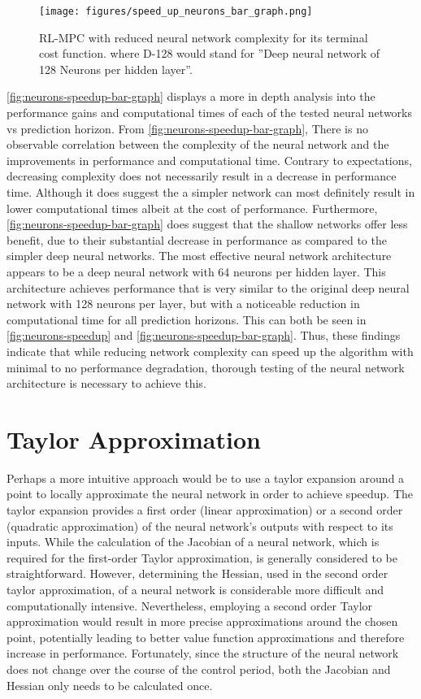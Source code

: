 \begin{figure}[H]
	\centering
	\texttt{[image: figures/speed\_up\_neurons\_bar\_graph.png]}
	\caption{RL-MPC with reduced neural network complexity for its terminal cost function. where D-128 would stand for ''Deep neural network of 128 Neurons per hidden layer''.}
	\label{fig:neurons-speedup-bar-graph}
\end{figure}
\autoref{fig:neurons-speedup-bar-graph} displays a more in depth analysis into the performance gains and computational times of each of the tested neural networks vs prediction horizon. From \autoref{fig:neurons-speedup-bar-graph}, There is no observable correlation between the complexity of the neural network and the improvements in performance and computational time. Contrary to expectations, decreasing complexity does not necessarily result in a decrease in performance time. Although it does suggest the a simpler network can most definitely result in lower computational times albeit at the cost of performance. Furthermore, \autoref{fig:neurons-speedup-bar-graph} does suggest that the shallow networks offer less benefit, due to their substantial decrease in performance as compared to the simpler deep neural networks. The most effective neural network architecture appears to be a deep neural network with 64 neurons per hidden layer. This architecture achieves performance that is very similar to the original deep neural network with 128 neurons per layer, but with a noticeable reduction in computational time for all prediction horizons. This can both be seen in \autoref{fig:neurons-speedup} and \autoref{fig:neurons-speedup-bar-graph}. Thus, these findings indicate that while reducing network complexity can speed up the algorithm with minimal to no performance degradation, thorough testing of the neural network architecture is necessary to achieve this.



\section{Taylor Approximation}
Perhaps a more intuitive approach would be to use a taylor expansion around a point to locally approximate the neural network in order to achieve speedup. The taylor expansion provides a  first order (linear approximation) or a second order (quadratic approximation) of the neural network's outputs with respect to its inputs. While the calculation of the Jacobian of a neural network, which is required for the first-order Taylor approximation, is generally considered to be straightforward. However, determining the Hessian, used in the second order taylor approximation, of a neural network is considerable more difficult and computationally intensive. Nevertheless, employing a second order Taylor approximation would result in more precise approximations around the chosen point, potentially leading to better value function approximations and therefore increase in performance. Fortunately, since the structure of the neural network does not change over the course of the control period, both the Jacobian and Hessian only needs to be calculated once. \\

